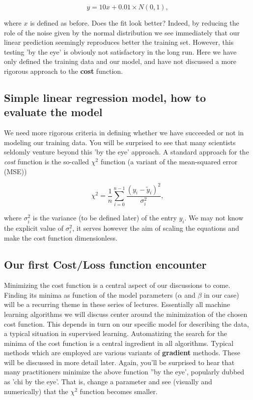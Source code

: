 \documentclass[%
oneside,                 %
final,                   %
10pt]{article}
\begin{document}
\[
y = 10x+0.01 \times N(0,1),
\]

where $x$ is defined as before.  Does the fit look better? Indeed, by
reducing the role of the noise given by the normal distribution we see immediately that
our linear prediction seemingly reproduces better the training
set. However, this testing 'by the eye' is obviouly not satisfactory in the
long run. Here we have only defined the training data and our model, and 
have not discussed a more rigorous approach to the \textbf{cost} function.


\subsection*{Simple linear regression model, how to evaluate the model}

We need more rigorous criteria in defining whether we have succeeded or
not in modeling our training data.  You will be surprised to see that
many scientists seldomly venture beyond this 'by the eye' approach. A
standard approach for the \emph{cost} function is the so-called $\chi^2$
function (a variant of the mean-squared error (MSE))

\[ \chi^2 = \frac{1}{n}
\sum_{i=0}^{n-1}\frac{(y_i-\tilde{y}_i)^2}{\sigma_i^2}, 
\] 

where $\sigma_i^2$ is the variance (to be defined later) of the entry
$y_i$.  We may not know the explicit value of $\sigma_i^2$, it serves
however the aim of scaling the equations and make the cost function
dimensionless.  

\subsection*{Our first Cost/Loss function encounter}

Minimizing the cost function is a central aspect of
our discussions to come. Finding its minima as function of the model
parameters ($\alpha$ and $\beta$ in our case) will be a recurring
theme in these series of lectures. Essentially all machine learning
algorithms we will discuss center around the minimization of the
chosen cost function. This depends in turn on our specific
model for describing the data, a typical situation in supervised
learning. Automatizing the search for the minima of the cost function is a
central ingredient in all algorithms. Typical methods which are
employed are various variants of \textbf{gradient} methods. These will be
discussed in more detail later. Again, you'll be surprised to hear that
many practitioners minimize the above function ''by the eye', popularly dubbed as 
'chi by the eye'. That is, change a parameter and see (visually and numerically) that 
the  $\chi^2$ function becomes smaller. 
\end{document}
